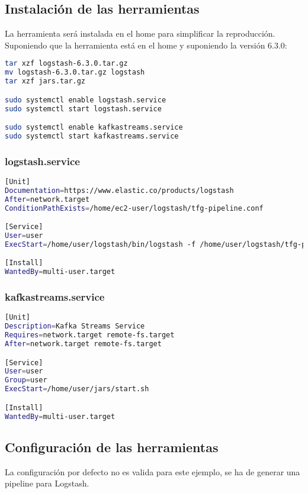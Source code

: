 \subsection{Instalación de las herramientas}
La herramienta será instalada en el home para simplificar la reproducción. Suponiendo que la herramienta está en el home y suponiendo la versión 6.3.0:
\begin{lstlisting}[language=Bash, breaklines=true]
tar xzf logstash-6.3.0.tar.gz
mv logstash-6.3.0.tar.gz logstash
tar xzf jars.tar.gz

sudo systemctl enable logstash.service
sudo systemctl start logstash.service

sudo systemctl enable kafkastreams.service
sudo systemctl start kafkastreams.service
\end{lstlisting}
\subsubsection{logstash.service}
\begin{lstlisting}[language=Bash, breaklines=true]
[Unit]
Documentation=https://www.elastic.co/products/logstash
After=network.target
ConditionPathExists=/home/ec2-user/logstash/tfg-pipeline.conf

[Service]
User=user
ExecStart=/home/user/logstash/bin/logstash -f /home/user/logstash/tfg-pipeline.conf --config.reload.automatic

[Install]
WantedBy=multi-user.target
\end{lstlisting}

\subsubsection{kafkastreams.service}
\begin{lstlisting}[language=Bash]
[Unit]
Description=Kafka Streams Service
Requires=network.target remote-fs.target
After=network.target remote-fs.target

[Service]
User=user
Group=user
ExecStart=/home/user/jars/start.sh

[Install]
WantedBy=multi-user.target
\end{lstlisting}

\subsection{Configuración de las herramientas}
La configuración por defecto no es valida para este ejemplo, se ha de generar una pipeline para Logstash.


